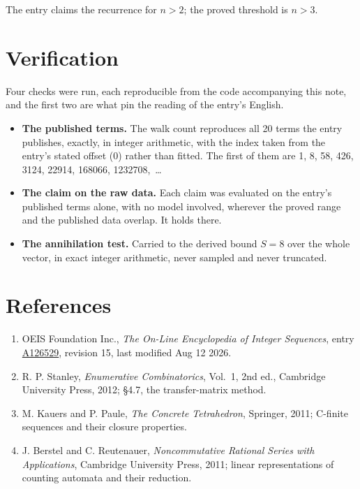 \documentclass[11pt]{article}
\theoremstyle{definition}
\begin{document}
The entry claims the recurrence for $n > 2$; the proved threshold is $n > 3$.

\section{Verification}

Four checks were run, each reproducible from the code accompanying this note, and the first two are what pin the reading of the entry's English.

\begin{itemize}

\item {\bfseries The published terms.} The walk count reproduces all 20 terms the entry publishes, exactly, in integer arithmetic, with the index taken from the entry's stated offset (0) rather than fitted. The first of them are 1, 8, 58, 426, 3124, 22914, 168066, 1232708,~\dots

\item {\bfseries The claim on the raw data.} Each claim was evaluated on the entry's published terms alone, with no model involved, wherever the proved range and the published data overlap. It holds there.

\item {\bfseries The annihilation test.} Carried to the derived bound $S = 8$ over the whole vector, in exact integer arithmetic, never sampled and never truncated.

\end{itemize}

\section{References}

\begin{enumerate}

\item OEIS Foundation Inc., \emph{The On-Line Encyclopedia of Integer Sequences}, entry \href{https://oeis.org/A126529}{A126529}, revision 15, last modified Aug 12 2026.

\item R. P. Stanley, \emph{Enumerative Combinatorics}, Vol.~1, 2nd ed., Cambridge University Press, 2012; \S4.7, the transfer-matrix method.

\item M. Kauers and P. Paule, \emph{The Concrete Tetrahedron}, Springer, 2011; C-finite sequences and their closure properties.

\item J. Berstel and C. Reutenauer, \emph{Noncommutative Rational Series with Applications}, Cambridge University Press, 2011; linear representations of counting automata and their reduction.

\end{enumerate}
\end{document}

